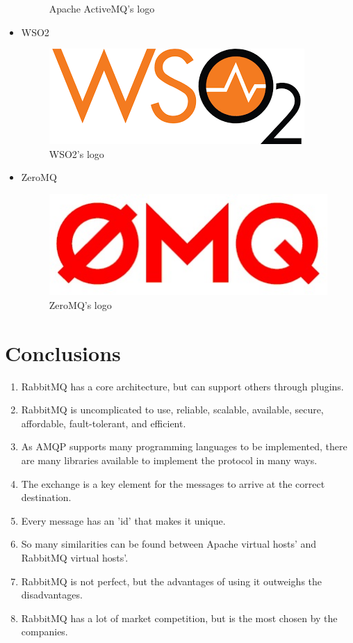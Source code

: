 \documentclass[12pt]{article}
\begin{document}
\begin{itemize}
\begin{figure}[H]
        \caption{Apache ActiveMQ's logo}
        \label{fig:activemq}
    \end{figure}
    \item WSO2
    \begin{figure}[H]
        \centering
        \includegraphics[scale = 0.7]{Images/WSO2.png}
        \caption{WSO2's logo}
        \label{fig:wso2}
    \end{figure}
    \newpage
    \item ZeroMQ
    \begin{figure}[H]
        \centering
        \includegraphics[scale = 0.7]{Images/zeromq-logo.jpg}
        \caption{ZeroMQ's logo}
        \label{fig:zeromq}
    \end{figure}
\end{itemize}

\section*{Conclusions}
\begin{enumerate}
    \item RabbitMQ has a core architecture, but can support others through plugins.
    \item RabbitMQ is uncomplicated to use, reliable, scalable, available, secure, affordable, fault-tolerant, and efficient.
    \item As AMQP supports many programming languages to be implemented, there are many libraries available to implement the protocol in many ways.
    \item The exchange is a key element for the messages to arrive at the correct destination.
    \item Every message has an 'id' that makes it unique.
    \item So many similarities can be found between Apache virtual hosts' and RabbitMQ virtual hosts'.
    \item RabbitMQ is not perfect, but the advantages of using it outweighs the disadvantages.
    \item RabbitMQ has a lot of market competition, but is the most chosen by the companies.
\end{enumerate}
\end{document}
